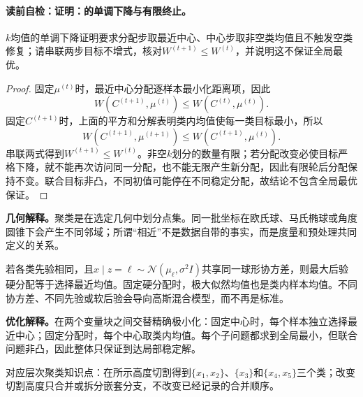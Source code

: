 \label{struct:V4-C02-CH13}
\paragraph{读前自检：证明：的单调下降与有限终止。}$k$均值的单调下降证明要求分配步取最近中心、中心步取非空类均值且不触发空类修复；请串联两步目标不增式，核对$W^{(t+1)}\le W^{(t)}$，并说明这不保证全局最优。\par

\begin{proof}
固定$\mu^{(t)}$时，最近中心分配逐样本最小化距离项，因此
\[
W(C^{(t+1)},\mu^{(t)})\leq W(C^{(t)},\mu^{(t)}).
\]
固定$C^{(t+1)}$时，上面的平方和分解表明类内均值使每一类目标最小，所以
\[
W(C^{(t+1)},\mu^{(t+1)})\leq W(C^{(t+1)},\mu^{(t)}).
\]
串联两式得到$W^{(t+1)}\leq W^{(t)}$。非空$k$划分的数量有限；若分配改变必使目标严格下降，就不能再次访问同一分配，也不能无限产生新分配，因此有限轮后分配保持不变。联合目标非凸，不同初值可能停在不同稳定分配，故结论不包含全局最优保证。
\end{proof}

\label{struct:V4-C02-CH14}
\begin{geometrybox}
\textbf{几何解释。}聚类是在选定几何中划分点集。同一批坐标在欧氏球、马氏椭球或角度圆锥下会产生不同邻域；所谓“相近”不是数据自带的事实，而是度量和预处理共同定义的关系。
\end{geometrybox}

\label{struct:V4-C02-CH15}
\begin{probabilitybox}
若各类先验相同，且$x\mid z=\ell\sim\mathcal N(\mu_\ell,\sigma^2I)$共享同一球形协方差，则最大后验硬分配等于选择最近均值。固定硬分配时，极大似然均值也是类内样本均值。不同协方差、不同先验或软后验会导向高斯混合模型，而不再是标准\kMeans{}。
\end{probabilitybox}

\label{struct:V4-C02-CH16}
\begin{optimizationbox}
\textbf{优化解释。}\kMeans{}在两个变量块之间交替精确极小化：固定中心时，每个样本独立选择最近中心；固定分配时，每个中心取类内均值。每个子问题都求到全局最小，但联合问题非凸，因此整体只保证到达局部稳定解。
\end{optimizationbox}

\label{struct:V4-C02-CH17}

对应层次聚类知识点：在所示高度切割得到$\{x_1,x_2\}$、$\{x_3\}$和$\{x_4,x_5\}$三个类；改变切割高度只合并或拆分嵌套分支，不改变已经记录的合并顺序。


